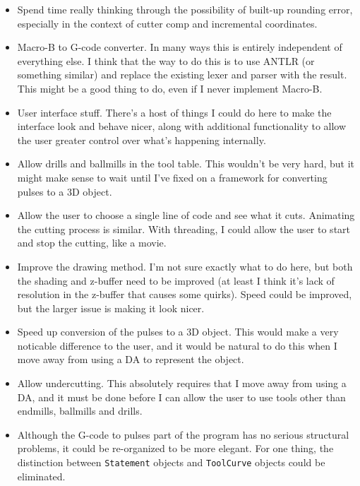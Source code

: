 \documentclass[titlepage,oneside,10pt]{article}
\begin{document}
\begin{itemize}
\setlength{\itemsep}{-1mm}
\item Spend time really thinking through the possibility of built-up
  rounding error, especially in the context of cutter comp and
  incremental coordinates.
\item Macro-B to G-code converter. In many ways this is entirely
  independent of everything else. I think that the way to do this is
  to use ANTLR (or something similar) and replace the existing lexer
  and parser with the result. This might be a good thing to do, even
  if I never implement Macro-B.
\item User interface stuff. There's a host of things I could do here
  to make the interface look and behave nicer, along with additional
  functionality to allow the user greater control over what's
  happening internally.
\item Allow drills and ballmills in the tool table. This wouldn't be
  very hard, but it might make sense to wait until I've fixed on a
  framework for converting pulses to a 3D object.
\item Allow the user to choose a single line of code and see what it
  cuts. Animating the cutting process is similar. With threading, I
  could allow the user to start and stop the cutting, like a movie.
\item Improve the drawing method. I'm not sure exactly what to do
  here, but both the shading and z-buffer need to be improved (at
  least I think it's lack of resolution in the z-buffer that causes
  some quirks). Speed could be improved, but the larger issue is
  making it look nicer.
\item Speed up conversion of the pulses to a 3D object. This would
  make a very noticable difference to the user, and it would be
  natural to do this when I move away from using a DA to represent the
  object.
\item Allow undercutting. This absolutely requires that I move away
  from using a DA, and it must be done before I can allow the user
  to use tools other than endmills, ballmills and drills.
\item Although the G-code to pulses part of the program has no serious
  structural problems, it could be re-organized to be more
  elegant. For one thing, the distinction between {\tt Statement}
  objects and {\tt ToolCurve} objects could be eliminated.
\end{itemize}
\end{document}

